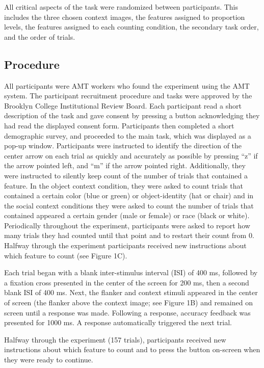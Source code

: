 \documentclass[english,,man,floatsintext]{apa6}
\begin{document}
All critical aspects of the task were randomized between participants.
This includes the three chosen context images, the features assigned to
proportion levels, the features assigned to each counting condition, the
secondary task order, and the order of trials.

\subsection{Procedure}\label{procedure}

All participants were AMT workers who found the experiment using the AMT
system. The participant recruitment procedure and tasks were approved by
the Brooklyn College Institutional Review Board. Each participant read a
short description of the task and gave consent by pressing a button
acknowledging they had read the displayed consent form. Participants
then completed a short demographic survey, and proceeded to the main
task, which was displayed as a pop-up window. Participants were
instructed to identify the direction of the center arrow on each trial
as quickly and accurately as possible by pressing \enquote{z} if the
arrow pointed left, and \enquote{m} if the arrow pointed right.
Additionally, they were instructed to silently keep count of the number
of trials that contained a feature. In the object context condition,
they were asked to count trials that contained a certain color (blue or
green) or object-identity (hat or chair) and in the social context
conditions they were asked to count the number of trials that contained
appeared a certain gender (male or female) or race (black or white).
Periodically throughout the experiment, participants were asked to
report how many trials they had counted until that point and to restart
their count from 0. Halfway through the experiment participants received
new instructions about which feature to count (see Figure 1C).

Each trial began with a blank inter-stimulus interval (ISI) of 400 ms,
followed by a fixation cross presented in the center of the screen for
200 ms, then a second blank ISI of 400 ms. Next, the flanker and context
stimuli appeared in the center of screen (the flanker above the context
image; see Figure 1B) and remained on screen until a response was made.
Following a response, accuracy feedback was presented for 1000 ms. A
response automatically triggered the next trial.

Halfway through the experiment (157 trials), participants received new
instructions about which feature to count and to press the button
on-screen when they were ready to continue.
\end{document}
